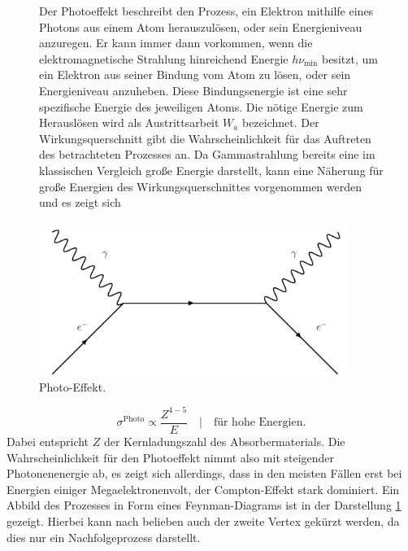 \begin{figure}
\begin{minipage}{0.5\textwidth}
Der Photoeffekt beschreibt den Prozess, ein Elektron mithilfe eines Photons aus einem Atom herauszulösen, oder sein Energieniveau anzuregen. 
Er kann immer dann vorkommen, wenn die elektromagnetische Strahlung hinreichend Energie $h\nu_{\text{min}}$ besitzt, um ein Elektron aus seiner Bindung vom Atom zu lösen, oder sein Energieniveau anzuheben. 
Diese Bindungsenergie ist eine sehr spezifische Energie des jeweiligen Atoms. Die nötige Energie zum Herauslösen wird als Austrittsarbeit $W_a$ bezeichnet. 
Der Wirkungsquerschnitt gibt die Wahrscheinlichkeit für das Auftreten des betrachteten Prozesses an.
Da Gammastrahlung bereits eine im klassischen Vergleich große Energie darstellt, kann eine Näherung für große Energien des Wirkungsquerschnittes vorgenommen werden und es zeigt sich
\end{minipage}
\begin{minipage}{0.5\textwidth}
    \centering
    \includegraphics[width=0.9\textwidth]{bilder/compton.pdf}
    \caption{Photo-Effekt. \cite{feynman}}
    \label{fig:hierhier}
\end{minipage}
\end{figure}

\begin{equation*}
\sigma^{\text{Photo}} \propto \frac{Z^{4-5}}{E} \quad | \quad \text{für hohe Energien}.
\end{equation*}
Dabei entspricht $Z$ der Kernladungszahl des Absorbermaterials. 
Die Wahrscheinlichkeit für den Photoeffekt nimmt also mit steigender Photonenenergie ab, es zeigt sich allerdings, dass in den meisten Fällen erst bei Energien einiger Megaelektronenvolt, der Compton-Effekt stark dominiert. 
Ein Abbild des Prozesses in Form eines Feynman-Diagrams ist in der Darstellung \ref{fig:hierhier} gezeigt. Hierbei kann nach belieben auch der zweite Vertex gekürzt werden, da dies nur ein Nachfolgeprozess darstellt.
\newpage
